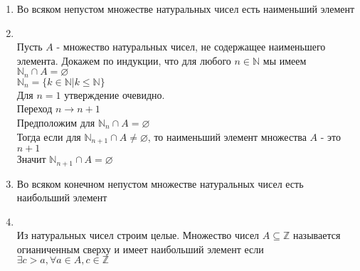 \documentclass[12pt,letterpaper]{report}
\makeatletter
\newcommand{\Z}{\mathbb{Z}}
\newcommand{\N}{\mathbb{N}}
\renewenvironment{proof}[1][\proofname]{%
   \par\pushQED{\qed}\normalfont%
   \topsep6\p@\@plus6\p@\relax
   \trivlist\item[\hskip\labelsep\bfseries#1\@addpunct{.}]%
   \ignorespaces
}{%
   \popQED\endtrivlist\@endpefalse
}
\makeatother
\begin{document}
\begin{enumerate}
    \item Во всяком непустом множестве натуральных чисел есть наименьший элемент  
    \begin{proof}
        \quad \\
        Пусть $A$ - множество натуральных чисел, не содержащее наименьшего элемента.
        Докажем по индукции, что для любого $n \in \mathbb{N}$ мы имеем $\mathbb{N}_n \cap A = \varnothing$ \\
        $\N_n = \{k \in \N | k \leqslant \N \}$ \\
        Для $n = 1$ утверждение очевидно. \\
        Переход $n \longrightarrow n+1$ \\
        Предположим для $\mathbb{N}_n \cap A = \varnothing$ \\
        Тогда если для $\mathbb{N}_{n+1} \cap A \neq \varnothing$, то наименьший элемент множества $A$ - это $n+1$ \\
        Значит $\mathbb{N}_{n+1} \cap A = \varnothing$
   \end{proof}
   \item Во всяком конечном непустом множестве натуральных чисел есть наибольший элемент
   \begin{proof}
        \quad \\
        Из натуральных чисел строим целые. Множество чисел $A \subseteq \Z$ называется огианиченным сверху и имеет наибольший элемент
        если $\exists c > a, \forall a \in A, c \in \Z$
    \end{proof}
\end{enumerate}
\end{document}
